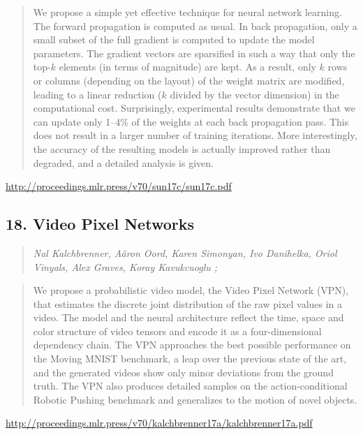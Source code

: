 \documentclass{article}
\begin{document}
\begin{quote}
    We propose a simple yet effective technique for neural network learning. The forward propagation is computed as usual. In back propagation, only a small subset of the full gradient is computed to update the model parameters. The gradient vectors are sparsified in such a way that only the top-$k$ elements (in terms of magnitude) are kept. As a result, only $k$ rows or columns (depending on the layout) of the weight matrix are modified, leading to a linear reduction ($k$ divided by the vector dimension) in the computational cost. Surprisingly, experimental results demonstrate that we can update only 1–4\% of the weights at each back propagation pass. This does not result in a larger number of training iterations. More interestingly, the accuracy of the resulting models is actually improved rather than degraded, and a detailed analysis is given.  \end{quote}

\href{http://proceedings.mlr.press/v70/sun17c/sun17c.pdf}{http://proceedings.mlr.press/v70/sun17c/sun17c.pdf}

\subsection{18. Video Pixel Networks}

\begin{quote}
\footnotesize{\textit{Nal Kalchbrenner, Aäron Oord, Karen Simonyan, Ivo Danihelka, Oriol Vinyals, Alex Graves, Koray Kavukcuoglu ;}}
\end{quote}

\begin{quote}
    We propose a probabilistic video model, the Video Pixel Network (VPN), that estimates the discrete joint distribution of the raw pixel values in a video. The model and the neural architecture reflect the time, space and color structure of video tensors and encode it as a four-dimensional dependency chain. The VPN approaches the best possible performance on the Moving MNIST benchmark, a leap over the previous state of the art, and the generated videos show only minor deviations from the ground truth. The VPN also produces detailed samples on the action-conditional Robotic Pushing benchmark and generalizes to the motion of novel objects.  \end{quote}

\href{http://proceedings.mlr.press/v70/kalchbrenner17a/kalchbrenner17a.pdf}{http://proceedings.mlr.press/v70/kalchbrenner17a/kalchbrenner17a.pdf}
\end{document}
